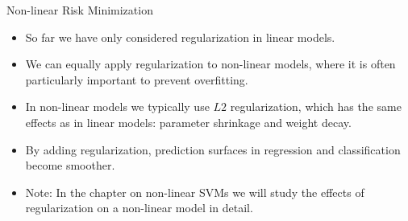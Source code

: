 \begin{vbframe}{Non-linear Risk Minimization}

\begin{itemize}
  \item So far we have only considered regularization in linear models.
  \item We can equally apply regularization to non-linear models, where it is 
  often particularly important to prevent overfitting.
  \item In non-linear models we typically use $L2$ regularization, which has the 
  same effects as in linear models: parameter shrinkage and weight decay.
  \item By adding regularization, prediction surfaces in regression and 
  classification become smoother. 
  \item Note: In the chapter on non-linear SVMs we will study the effects of
  regularization on a non-linear model in detail. 
\end{itemize}

\end{vbframe}


